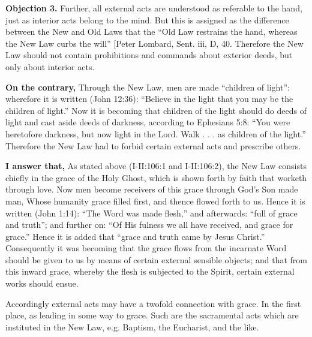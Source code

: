 \textbf{Objection 3.} Further, all external acts are understood as referable to the hand, just as interior acts belong to the mind. But this is assigned as the difference between the New and Old Laws that the ``Old Law restrains the hand, whereas the New Law curbs the will'' [Peter Lombard, Sent. iii, D, 40. Therefore the New Law should not contain prohibitions and commands about exterior deeds, but only about interior acts.

\textbf{On the contrary,} Through the New Law, men are made ``children of light'': wherefore it is written (John 12:36): ``Believe in the light that you may be the children of light.'' Now it is becoming that children of the light should do deeds of light and cast aside deeds of darkness, according to Ephesians 5:8: ``You were heretofore darkness, but now light in the Lord. Walk . . . as children of the light.'' Therefore the New Law had to forbid certain external acts and prescribe others.

\textbf{I answer that,} As stated above (I-II:106:1 and I-II:106:2), the New Law consists chiefly in the grace of the Holy Ghost, which is shown forth by faith that worketh through love. Now men become receivers of this grace through God's Son made man, Whose humanity grace filled first, and thence flowed forth to us. Hence it is written (John 1:14): ``The Word was made flesh,'' and afterwards: ``full of grace and truth''; and further on: ``Of His fulness we all have received, and grace for grace.'' Hence it is added that ``grace and truth came by Jesus Christ.'' Consequently it was becoming that the grace flows from the incarnate Word should be given to us by means of certain external sensible objects; and that from this inward grace, whereby the flesh is subjected to the Spirit, certain external works should ensue.

Accordingly external acts may have a twofold connection with grace. In the first place, as leading in some way to grace. Such are the sacramental acts which are instituted in the New Law, e.g. Baptism, the Eucharist, and the like.


